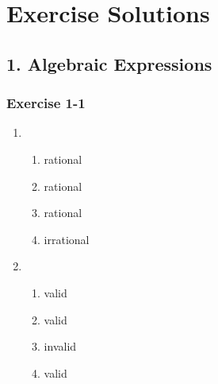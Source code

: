 \chapter{Exercise Solutions}

\section{1. Algebraic Expressions}

\subsection{Exercise 1-1} %
\begin{enumerate}[noitemsep, label=\textbf{\arabic*}. ] 
\item %
  \begin{enumerate}[itemsep=5pt, label=\textbf{(\alph*)} ] 
    \item rational
    \item rational
    \item rational
    \item irrational
    \end{enumerate}
\item %
    \begin{enumerate}[itemsep=5pt, label=\textbf{(\alph*)} ] 
    \item valid
    \item valid
    \item invalid
    \item valid
    \end{enumerate}


\end{enumerate}
